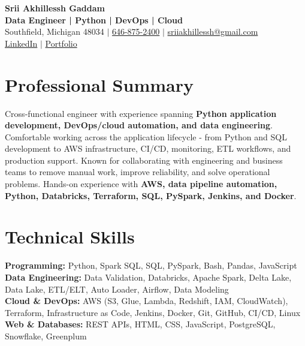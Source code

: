 \documentclass[letterpaper,10pt]{article}
\begin{document}
\fontsize{9.35pt}{10.45pt}\selectfont

\begin{center}
    {\LARGE \textbf{Srii Akhillessh Gaddam}} \\[-1pt]
    \textbf{Data Engineer | Python | DevOps | Cloud} \\[2pt]
    Southfield, Michigan 48034 $|$
    \href{tel:6468752400}{646-875-2400} $|$
    \href{mailto:sriiakhillessh@gmail.com}{sriiakhillessh@gmail.com} \\[1pt]
    \href{https://www.linkedin.com/in/srii-akhiilessh-gaddam-b48668191/}{LinkedIn} $|$
    \href{https://sriiakhillesshg.github.io/portfolio/}{Portfolio}
\end{center}
\vspace{-8pt}

\section{Professional Summary}
\small{Cross-functional engineer with experience spanning \textbf{Python application development, DevOps/cloud automation, and data engineering}. Comfortable working across the application lifecycle - from Python and SQL development to AWS infrastructure, CI/CD, monitoring, ETL workflows, and production support. Known for collaborating with engineering and business teams to remove manual work, improve reliability, and solve operational problems. Hands-on experience with \textbf{AWS, data pipeline automation, Python, Databricks, Terraform, SQL, PySpark, Jenkins, and Docker}.}

\section{Technical Skills}
\small{
\textbf{Programming:} Python, Spark SQL, SQL, PySpark, Bash, Pandas, JavaScript \\
\textbf{Data Engineering:} Data Validation, Databricks, Apache Spark, Delta Lake, Data Lake, ETL/ELT, Auto Loader, Airflow, Data Modeling \\
\textbf{Cloud \& DevOps:} AWS (S3, Glue, Lambda, Redshift, IAM, CloudWatch), Terraform, Infrastructure as Code, Jenkins, Docker, Git, GitHub, CI/CD, Linux \\
\textbf{Web \& Databases:} REST APIs, HTML, CSS, JavaScript, PostgreSQL, Snowflake, Greenplum
}
\end{document}
